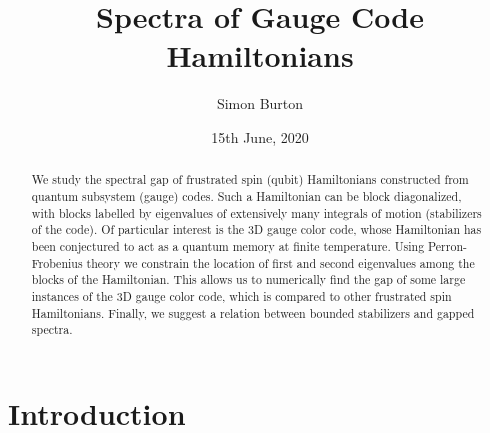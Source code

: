 \documentclass[a4paper,onecolumn,11pt,unpublished]{quantumarticle}
\title{Spectra of Gauge Code Hamiltonians}
\author{Simon Burton}
\date{15th June, 2020}
\begin{document}
\maketitle

\begin{abstract}
We study the spectral gap of frustrated spin (qubit)
Hamiltonians constructed from quantum subsystem (gauge) codes.
Such a Hamiltonian can be block diagonalized, with
blocks labelled by eigenvalues of extensively many
integrals of motion (stabilizers of the code).
Of particular interest is the 3D gauge color code,
whose Hamiltonian has been conjectured to act as a quantum
memory at finite temperature. 
Using Perron-Frobenius theory we constrain the
location of first and second eigenvalues among the
blocks of the Hamiltonian.
This allows us to numerically find the gap of some large instances
of the 3D gauge color code, which is compared to 
other frustrated spin Hamiltonians.
Finally, we suggest a relation between bounded 
stabilizers and gapped spectra.
\end{abstract}


\tableofcontents


\section{Introduction}
\end{document}
